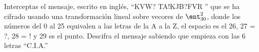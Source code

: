 \begin{problem}[4]
Interceptas el mensaje, escrito en inglés, ``KVW? TA!KJB?FVR '' que se ha cifrado usando una transformación lineal sobre vecores de $\ent_{30}^2$, donde los números del 0 al 25 equivalen a las letras de la A a la Z, el espacio es el 26, 27 = ?, 28 = ! y 29 es el punto. Descifra el mensaje sabiendo que empieza con las 6 letras ``C.I.A.''

\solution
\end{problem}

\begin{problem}[5]


\solution
\end{problem}

\begin{problem}[6]


\solution
\end{problem}

\begin{problem}[7]


\solution
\end{problem}

\begin{problem}[8]


\solution
\end{problem}

\begin{problem}[9]


\solution
\end{problem}

\begin{problem}[10]


\solution
\end{problem}

\begin{problem}[11]


\solution
\end{problem}

\begin{problem}[12]


\solution
\end{problem}

\begin{problem}[13]


\solution
\end{problem}
